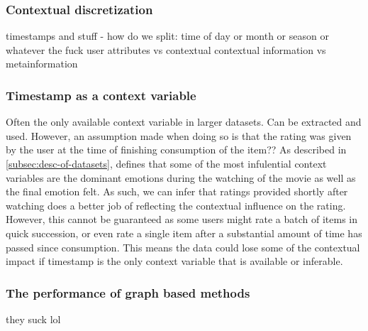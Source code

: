 \subsubsection{Contextual discretization}
timestamps and stuff - how do we split: time of day or month or season or whatever the fuck
user attributes vs contextual
contextual information vs metainformation
\subsubsection{Timestamp as a context variable}
Often the only available context variable in larger datasets.
Can be extracted and used.
However, an assumption made when doing so is that the rating was given by the user at the time of finishing consumption of the item??
As described in \autoref{subsec:desc-of-datasets}, \cite{COMODA2013} defines that some of the most infulential context variables are the dominant emotions during the watching of the movie as well as the final emotion felt.
As such, we can infer that ratings provided shortly after watching does a better job of reflecting the contextual influence on the rating.
However, this cannot be guaranteed as some users might rate a batch of items in quick succession, or even rate a single item after a substantial amount of time has passed since consumption.
This means the data could lose some of the contextual impact if timestamp is the only context variable that is available or inferable.  
\subsubsection{The performance of graph based methods}
they suck lol


